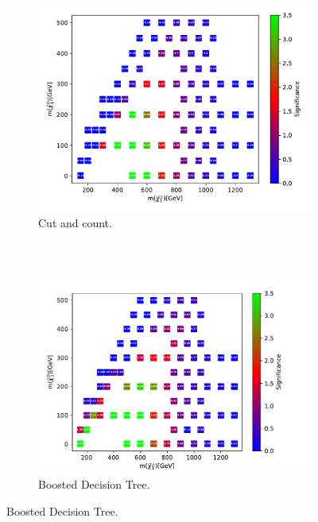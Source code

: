 \begin{figure}[H]
    \centering
    \begin{subfigure}[t!]{0.49\textwidth}
    \includegraphics[width = \textwidth]{Figures/Significances/significanceCutandCount_slepsnu_all.pdf}
    \caption{Cut and count.}
        \label{fig:signLowslepsnucandc}
    \end{subfigure}
    \\
    \begin{subfigure}[t!]{0.49\textwidth}
    \includegraphics[width = \textwidth]{Figures/Significances/significance_BDT_slepsnu_Low_level.pdf}
    \caption{Boosted Decision Tree.}
        \label{fig:signLowslepsnuBDT}
    \end{subfigure}      

\end{figure}
